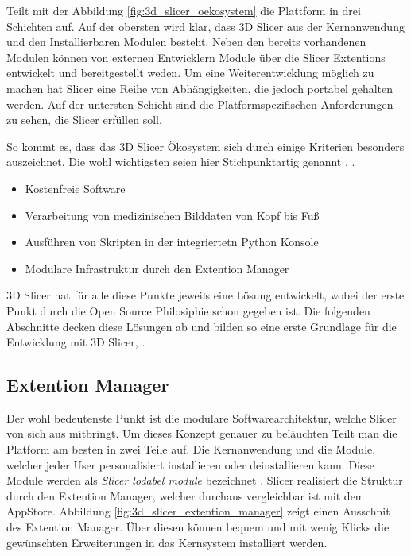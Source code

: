 \citet[Seite 1326]{fedorov2012slicer} Teilt mit der Abbildung \ref{fig:3d_slicer_oekosystem}
die Plattform in drei Schichten auf. Auf der obersten wird klar, dass 3D Slicer aus
der Kernanwendung und den Installierbaren Modulen besteht. Neben den bereits
vorhandenen Modulen können von externen Entwicklern Module über die Slicer
Extentions entwickelt und bereitgestellt weden. Um eine Weiterentwicklung möglich
zu machen hat Slicer eine Reihe von Abhängigkeiten, die jedoch portabel gehalten
werden. Auf der untersten Schicht sind die Platformspezifischen Anforderungen zu
sehen, die Slicer erfüllen soll.

So kommt es, dass das 3D Slicer Ökosystem sich durch einige Kriterien besonders auszeichnet.
Die wohl wichtigsten seien hier Stichpunktartig genannt \citep[vgl.][]{slicer2024},
\citep[vgl.][]{fedorov2012slicer}.

\begin{itemize}
	\item Kostenfreie Software

	\item Verarbeitung von medizinischen Bilddaten von Kopf bis Fuß

	\item Ausführen von Skripten in der integriertetn Python Konsole

	\item Modulare Infrastruktur durch den Extention Manager
\end{itemize}

3D Slicer hat für alle diese Punkte jeweils eine Lösung entwickelt, wobei der erste
Punkt durch die Open Source Philosiphie schon gegeben ist. Die folgenden
Abschnitte decken diese Lösungen ab und bilden so eine erste Grundlage für die
Entwicklung mit 3D Slicer\citep[vgl.][]{slicer2024}, \citep[vgl.][]{fedorov2012slicer}.

\subsection{Extention Manager}
Der wohl bedeutenste Punkt ist die modulare Softwarearchitektur, welche Slicer von
sich aus mitbringt. Um dieses Konzept genauer zu beläuchten Teilt man die
Platform am besten in zwei Teile auf. Die Kernanwendung und die Module, welcher
jeder User personalisiert installieren oder deinstallieren kann. Diese Module werden
als \textit{Slicer lodabel module} bezeichnet \citep[vgl.][Seite 1332]{fedorov2012slicer}.
Slicer realisiert die Struktur durch den Extention Manager, welcher durchaus
vergleichbar ist mit dem AppStore. Abbildung \ref{fig:3d_slicer_extention_manager}
zeigt einen Ausschnit des Extention Manager. Über diesen können bequem und mit
wenig Klicks die gewünschten Erweiterungen in das Kernsystem installiert werden.

